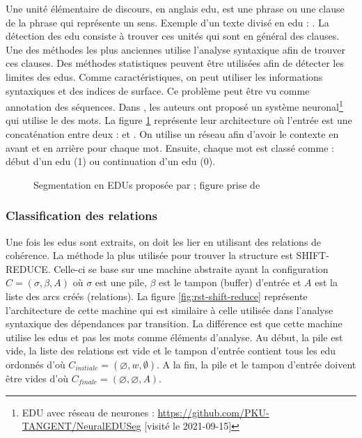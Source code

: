\documentclass{KodeBook}
\begin{document}
Une unité élémentaire de discours, en anglais \ac{edu}, est une phrase ou une clause de la phrase qui représente un sens. 
Exemple d'un texte divisé en \ac{edu} : . 
La détection des \ac{edu} consiste à trouver ces unités qui sont en général des clauses. 
Une des méthodes les plus anciennes utilise l'analyse syntaxique afin de trouver ces clauses. 
Des méthodes statistiques peuvent être utilisées afin de détecter les limites des \ac{edu}s. 
Comme caractéristiques, on peut utiliser les informations syntaxiques et des indices de surface. 
Ce problème peut être vu comme annotation des séquences. 
Dans \cite{2018-wang-al}, les auteurs ont proposé un système neuronal\footnote{EDU avec réseau de neurones : \url{https://github.com/PKU-TANGENT/NeuralEDUSeg} [visité le 2021-09-15]} qui utilise le  des mots. 
La figure \ref{fig:edu-embedding} représente leur architecture où l'entrée est une concaténation entre deux  :  et . 
On utilise un réseau  afin d'avoir le contexte en avant et en arrière pour chaque mot. 
Ensuite, chaque mot est classé comme : début d'un \ac{edu} (1) ou continuation d'un \ac{edu} (0). 

\begin{figure}[!ht]
	\centering
	\caption[Segmentation en EDUs par embeddings]{Segmentation en EDUs proposée par \citet{2018-wang-al} ; figure prise de \cite{2019-jurafsky-martin}}
	\label{fig:edu-embedding}
\end{figure}

\subsubsection{Classification des relations}

Une fois les \acp{edu} sont extraits, on doit les lier en utilisant des relations de cohérence. 
La méthode la plus utilisée pour trouver la structure  est SHIFT-REDUCE.  
Celle-ci se base sur une machine abstraite ayant la configuration $C = (\sigma, \beta, A)$ où $\sigma$ est une pile, $\beta$ est le tampon (buffer) d'entrée et $A$ est la liste des arcs créés (relations). 
La figure \ref{fig:rst-shift-reduce} représente l'architecture de cette machine qui est similaire à celle utilisée dans l'analyse syntaxique des dépendances par transition. 
La différence est que cette machine utilise les \acp{edu} et pas les mots comme éléments d'analyse.
Au début, la pile est vide, la liste des relations est vide et le tampon d'entrée contient tous les \ac{edu} ordonnés d'où  $C_{initiale} = (\varnothing, w, \emptyset)$. 
A la fin, la pile et le tampon d'entrée doivent être vides d'où $C_{finale} = (\varnothing, \varnothing, A)$.
\end{document}
